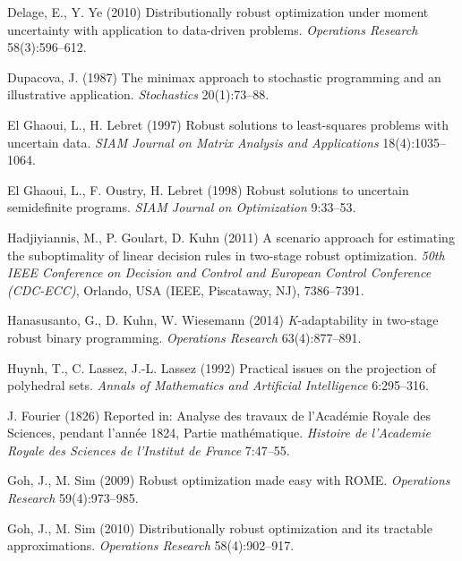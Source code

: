 \documentclass[fleqn,mnsc,blindrev]{informs4}
\begin{document}
\begin{thebibliography}{}
			Delage, E., Y. Ye (2010)
			Distributionally robust optimization under moment uncertainty with application to data-driven problems. {\it Operations Research} 58(3):596--612.
			
			Dupacova, J. (1987)
			The minimax approach to stochastic programming and an illustrative application. {\it Stochastics} 20(1):73--88.
			
			El Ghaoui, L., H. Lebret (1997)
			Robust solutions to least-squares problems with uncertain data. {\it SIAM Journal on Matrix Analysis and Applications} 18(4):1035--1064.
			
			El Ghaoui, L., F. Oustry, H. Lebret (1998)
			Robust solutions to uncertain semidefinite programs. {\it SIAM Journal on Optimization} 9:33--53.


			Hadjiyiannis, M., P. Goulart, D. Kuhn (2011)
			A scenario approach for estimating the suboptimality of linear decision rules in two-stage robust optimization.
			{\it 50th IEEE Conference on Decision and Control and European Control Conference (CDC-ECC)}, Orlando, USA (IEEE, Piscataway, NJ), 7386--7391.			
			
			Hanasusanto, G., D. Kuhn, W. Wiesemann (2014)
			{\it K}-adaptability in two-stage robust binary programming.
			{\it Operations Research} 63(4):877--891.
			
			Huynh, T., C. Lassez, J.-L. Lassez (1992)
			Practical issues on the projection of polyhedral sets.
			{\it Annals of Mathematics and Artificial Intelligence} 6:295--316.
			
			
			
			J. Fourier (1826)
			{R}eported in: {A}nalyse des travaux de l{'}{A}cad\'emie {R}oyale des {S}ciences, pendant l{'}ann\'ee 1824, {P}artie math\'ematique. {\it {{H}istoire de l{'}{A}cademie {R}oyale des {S}ciences de l{'}Institut de {F}rance}} 7:47--55.
			
			
			
			Goh, J., M. Sim (2009)
			Robust optimization made easy with ROME. {\it Operations Research} 59(4):973--985.
			
			Goh, J., M. Sim (2010)
			Distributionally robust optimization and its tractable approximations. {\it Operations Research} 58(4):902--917.
			

\end{thebibliography}
\end{document}
